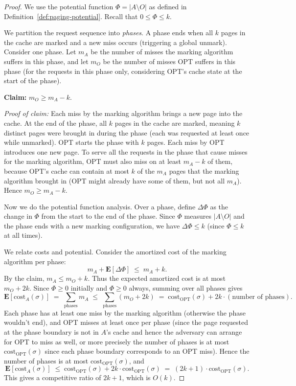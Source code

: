\documentclass[twoside,12pt]{book}
\theoremstyle{plain}
\theoremstyle{definition}
\theoremstyle{remark}
\begin{document}
\begin{proof}
We use the potential function $\Phi = |A \setminus O|$ as defined in
Definition~\ref{def:paging-potential}.  Recall that $0 \le \Phi \le k$.

We partition the request sequence into \emph{phases}.  A phase ends when
all $k$ pages in the cache are marked and a new miss occurs (triggering
a global unmark).  Consider one phase.  Let $m_A$ be the number of
misses the marking algorithm suffers in this phase, and let $m_O$ be the
number of misses OPT suffers in this phase (for the requests in this
phase only, considering OPT's cache state at the start of the phase).

\textbf{Claim:} $m_O \ge m_A - k$.

\emph{Proof of claim:} Each miss by the marking algorithm brings a new
page into the cache.  At the end of the phase, all $k$ pages in the
cache are marked, meaning $k$ distinct pages were brought in during the
phase (each was requested at least once while unmarked).  OPT starts
the phase with $k$ pages.  Each miss by OPT introduces one new page.
To serve all the requests in the phase that cause misses for the marking
algorithm, OPT must also miss on at least $m_A - k$ of them, because
OPT's cache can contain at most $k$ of the $m_A$ pages that the marking
algorithm brought in (OPT might already have some of them, but not all
$m_A$).  Hence $m_O \ge m_A - k$.

Now we do the potential function analysis.  Over a phase, define
$\Delta\Phi$ as the change in $\Phi$ from the start to the end of the
phase.  Since $\Phi$ measures $|A \setminus O|$ and the phase ends with
a new marking configuration, we have $\Delta\Phi \le k$ (since $\Phi \le
k$ at all times).

We relate costs and potential.  Consider the amortized cost of the
marking algorithm per phase:
\[
  m_A + \mathbf{E}[\Delta\Phi] \;\le\; m_A + k.
\]
By the claim, $m_A \le m_O + k$.  Thus the expected amortized cost is at
most $m_O + 2k$.  Since $\Phi \ge 0$ initially and $\Phi \ge 0$ always,
summing over all phases gives
\[
  \mathbf{E}[\mathrm{cost}_A(\sigma)] \;=\; \sum_{\text{phases}} m_A \;\le\; \sum_{\text{phases}} (m_O + 2k) \;=\; \mathrm{cost}_{\mathrm{OPT}}(\sigma) + 2k \cdot (\text{number of phases}).
\]
Each phase has at least one miss by the marking algorithm (otherwise the
phase wouldn't end), and OPT misses at least once per phase (since the
page requested at the phase boundary is not in $A$'s cache and hence
the adversary can arrange for OPT to miss as well, or more precisely the
number of phases is at most $\mathrm{cost}_{\mathrm{OPT}}(\sigma)$ since
each phase boundary corresponds to an OPT miss).  Hence the number of
phases is at most $\mathrm{cost}_{\mathrm{OPT}}(\sigma)$, and
\[
  \mathbf{E}[\mathrm{cost}_A(\sigma)] \;\le\; \mathrm{cost}_{\mathrm{OPT}}(\sigma) + 2k \cdot \mathrm{cost}_{\mathrm{OPT}}(\sigma) \;=\; (2k+1) \cdot \mathrm{cost}_{\mathrm{OPT}}(\sigma).
\]
This gives a competitive ratio of $2k+1$, which is $O(k)$.
\end{proof}
\end{document}
